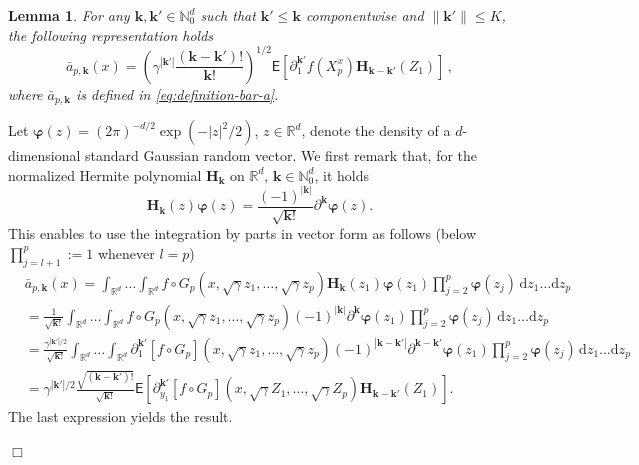 \documentclass[bj]{imsart}
\def\PE{\mathsf{E}}
\def\rmd{\mathrm{d}}
\newcommand{\proofendsign}{$\Box$}
\newtheorem{lem}[thm]{Lemma}
\newenvironment{proof}{{\noindent \bf Proof }}
 {{\hspace*{\fill}\proofendsign\par\bigskip}}
\def\eqsp{\,}
\begin{document}
\begin{lem}\label{eq:a_repr}
For any \(\mathbf{k},\mathbf{k}'\in \mathbb{N}_0^d\) such that \(\mathbf{k}'\le \mathbf{k}\) componentwise and $\| \mathbf{k}' \| \leq K$, the following representation holds
\[
\bar a_{p,\mathbf{k}}(x)=\left(\gamma^{|\mathbf{k}'|}\frac{(\mathbf{k}-\mathbf{k}') !}{\mathbf{k}!}\right)^{1/2}
\PE\left[
\partial_{1}^{\mathbf{k}'}f(X^x_p)\mathbf{H}_{\mathbf{k}-\mathbf{k}'}(Z_1)\right] \eqsp,
\]
where $\bar a_{p,\mathbf{k}}$ is defined in \eqref{eq:definition-bar-a}.
\end{lem}

\begin{proof}
Let $\boldsymbol{\varphi}(z)=(2\pi)^{-d/2} \exp(-|z|^2/2)$,
$z\in\mathbb R^d$, denote the density of a $d$-dimensional
standard Gaussian random vector.
We first remark that, for the normalized Hermite polynomial $\mathbf H_{\mathbf k}$ on $\mathbb R^d$,
$\mathbf k\in\mathbb N_0^d$, it holds
$$
\mathbf{H}_{\mathbf{k}}(z)\boldsymbol{\varphi}(z)
=\frac{(-1)^{|\mathbf{k}|}}{\sqrt{\mathbf{k} !}} \partial^{\mathbf{k}} \boldsymbol{\varphi}(z).
$$
This enables to use the integration by parts in vector form as follows
(below $\prod_{j=l+1}^p:=1$ whenever $l=p$)
\begin{align*}
&\bar a_{p,\mathbf{k}}(x)
 =
\int_{\mathbb R^d}\ldots\int_{\mathbb R^d}
f\circ G_{p}(x,\sqrt{\gamma}z_{1},\ldots,\sqrt{\gamma}z_{p})
\mathbf{H}_{\mathbf{k}}(z_{1})\boldsymbol{\varphi}(z_1)
\prod_{j=2}^p\boldsymbol{\varphi}(z_j)\, \rmd z_{1}\ldots \rmd z_{p}
\\
& =
\frac{1}{\sqrt{\mathbf k!}}
\int_{\mathbb R^d}\ldots\int_{\mathbb R^d}
f\circ G_{p}(x,\sqrt{\gamma}z_{1},\ldots,\sqrt{\gamma}z_{p})
(-1)^{|\mathbf{k}|}\partial^{\mathbf{k}} \boldsymbol{\varphi}(z_1)
\prod_{j=2}^p\boldsymbol{\varphi}(z_j)\, \rmd z_{1}\ldots  \rmd z_{p}
\\
& =
\frac{\gamma^{|\mathbf k'|/2}}{\sqrt{\mathbf k!}}
\int_{\mathbb R^d}\ldots\int_{\mathbb R^d}
\partial_{1}^{\mathbf k'}[f\circ G_{p}](x,\sqrt{\gamma}z_{1},\ldots,\sqrt{\gamma}z_{p})
(-1)^{|\mathbf{k}-\mathbf k'|}\partial^{\mathbf{k}-\mathbf k'} \boldsymbol{\varphi}(z_1)
\prod_{j=2}^p\boldsymbol{\varphi}(z_j)\, \rmd z_{1}\ldots \rmd z_{p}
\\
 & =\gamma^{|\mathbf{k}'|/2}\frac{\sqrt{(\mathbf{k}-\mathbf{k}')!}}{\sqrt{\mathbf{k}!}}\mathsf{E}\left[\partial_{y_{1}}^{\mathbf{k}'}[f\circ G_{p}](x,\sqrt{\gamma}Z_{1},\ldots,\sqrt{\gamma}Z_{p})\mathbf{H}_{\mathbf{k}-\mathbf{k}'}(Z_{1})\right].
\end{align*}
The last expression yields the result.
\end{proof}
\end{document}
